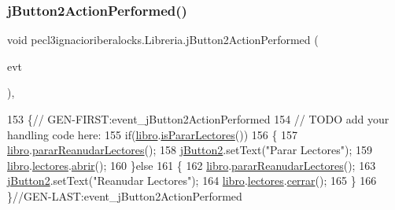 \subsubsection{\texorpdfstring{j\+Button2\+Action\+Performed()}{jButton2ActionPerformed()}}
{\footnotesize\ttfamily void pecl3ignacioriberalocks.\+Libreria.\+j\+Button2\+Action\+Performed (\begin{DoxyParamCaption}\item[{java.\+awt.\+event.\+Action\+Event}]{evt }\end{DoxyParamCaption})\hspace{0.3cm}{\ttfamily [inline]}, {\ttfamily [private]}}


\begin{DoxyCode}
153                                                                          \{\textcolor{comment}{//
      GEN-FIRST:event\_jButton2ActionPerformed}
154         \textcolor{comment}{// TODO add your handling code here:}
155         \textcolor{keywordflow}{if}(\mbox{\hyperlink{classpecl3ignacioriberalocks_1_1_libreria_a290dab678038bf9dd32c955e19986944}{libro}}.\mbox{\hyperlink{classpecl3ignacioriberalocks_1_1_libro_ad610273d7ceed921e576e0c92ab083c1}{isPararLectores}}())
156         \{
157             \mbox{\hyperlink{classpecl3ignacioriberalocks_1_1_libreria_a290dab678038bf9dd32c955e19986944}{libro}}.\mbox{\hyperlink{classpecl3ignacioriberalocks_1_1_libro_a400ffab628cf38370362f1c7fec24c47}{pararReanudarLectores}}();
158             \mbox{\hyperlink{classpecl3ignacioriberalocks_1_1_libreria_acc9d4371c4ed2d11e66f0c90303d10a5}{jButton2}}.setText(\textcolor{stringliteral}{"Parar Lectores"});
159             \mbox{\hyperlink{classpecl3ignacioriberalocks_1_1_libreria_a290dab678038bf9dd32c955e19986944}{libro}}.\mbox{\hyperlink{classpecl3ignacioriberalocks_1_1_libro_a9a3f7e435b4f83a7479dc1cdd7c79027}{lectores}}.\mbox{\hyperlink{classpecl3ignacioriberalocks_1_1_monitor_a545e3f6a3c058b60d7d41a21af3c8d5c}{abrir}}();
160         \}\textcolor{keywordflow}{else}
161         \{
162             \mbox{\hyperlink{classpecl3ignacioriberalocks_1_1_libreria_a290dab678038bf9dd32c955e19986944}{libro}}.\mbox{\hyperlink{classpecl3ignacioriberalocks_1_1_libro_a400ffab628cf38370362f1c7fec24c47}{pararReanudarLectores}}();
163             \mbox{\hyperlink{classpecl3ignacioriberalocks_1_1_libreria_acc9d4371c4ed2d11e66f0c90303d10a5}{jButton2}}.setText(\textcolor{stringliteral}{"Reanudar Lectores"});
164             \mbox{\hyperlink{classpecl3ignacioriberalocks_1_1_libreria_a290dab678038bf9dd32c955e19986944}{libro}}.\mbox{\hyperlink{classpecl3ignacioriberalocks_1_1_libro_a9a3f7e435b4f83a7479dc1cdd7c79027}{lectores}}.\mbox{\hyperlink{classpecl3ignacioriberalocks_1_1_monitor_aa780ba5836e28e77615854afb0ad251d}{cerrar}}();
165         \}
166     \}\textcolor{comment}{//GEN-LAST:event\_jButton2ActionPerformed}
\end{DoxyCode}
